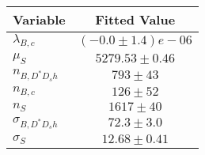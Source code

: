 \begin{tabular}[t]{lc}
\hline
Variable &Fitted Value\\
\hline\hline
$\lambda_{B,c}$&$(-0.0\pm1.4)e-06$\\
\hline
$\mu_S$&$5279.53\pm0.46$\\
\hline
$n_{B, D^* D_s h}$&$793\pm43$\\
\hline
$n_{B,c}$&$126\pm52$\\
\hline
$n_S$&$1617\pm40$\\
\hline
$\sigma_{B, D^* D_s h}$&$72.3\pm3.0$\\
\hline
$\sigma_S$&$12.68\pm0.41$\\
\hline
\end{tabular}